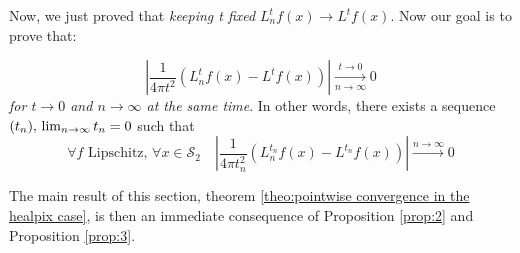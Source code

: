 Now, we just proved that \textit{keeping t fixed} $L_n^tf(x)\rightarrow L^tf(x)$. Now our goal is to prove that:

\vspace{0.5cm}
\begin{prop}\label{prop:2}
$$\left|\frac{1}{4\pi t^2}\left(L_n^tf(x) -L^tf(x)\right)\right|\xrightarrow[n\to \infty]{t\to 0}0$$
\textit{for $t\to0$ and $n\to\infty$ at the same time}. In other words, there exists a sequence $(t_n), \\ \lim_{n\to\infty}t_n=0$ such that 
$$\forall f \text{ Lipschitz, } \forall x\in\mathcal S_2 \quad \left|\frac{1}{4\pi t_n^2}\left(L_n^{t_n}f(x) - L^{t_n}f(x)\right)\right|\xrightarrow{n\to \infty}0$$
\end{prop}
\vspace{0.5cm}

The main result of this section, theorem  \ref{theo:pointwise convergence in the healpix case}, is then an immediate consequence of Proposition \ref{prop:2} and Proposition \ref{prop:3}.


